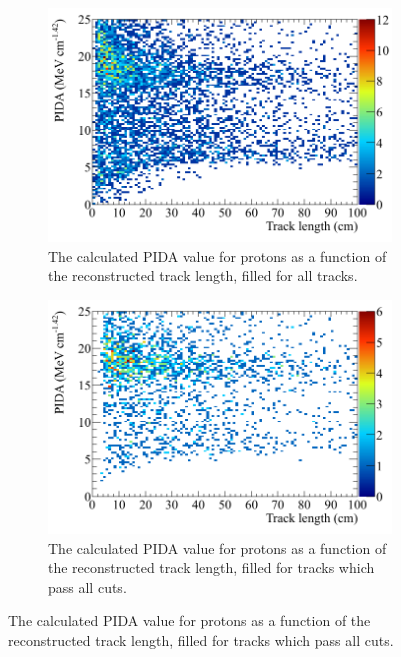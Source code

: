 \begin{figure}
\begin{subfigure}{0.48\textwidth}
        \label{fig:CRY_PIDATrLen_Muon_End}
  \end{subfigure}
  \begin{subfigure}{0.48\textwidth}
        \centering
        \includegraphics[width=\textwidth]{ProtonEnrich_500V_v05_14_00_trackpmtrackdc_Proton_All_PIDA_TrackLen}
        \caption{The calculated PIDA value for protons as a function of the reconstructed track length, filled for all tracks.}
        \label{fig:CRY_PIDATrLen_Proton_All}
  \end{subfigure}%
  \hspace{0.03\textwidth}%
  \begin{subfigure}{0.48\textwidth}
        \centering
        \includegraphics[width=\textwidth]{ProtonEnrich_500V_v05_14_00_trackpmtrackdc_Proton_End_PIDA_TrackLen}
        \caption{The calculated PIDA value for protons as a function of the reconstructed track length, filled for tracks which pass all cuts.}

\end{subfigure}
\end{figure}
